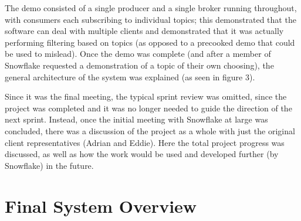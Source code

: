 \documentclass[a4paper, 12pt, twoside]{article}
\begin{document}
The demo consisted of a single producer and a single broker running throughout, with consumers each subscribing to individual topics; this demonstrated that the software can deal with multiple clients and demonstrated that it was actually performing filtering based on topics (as opposed to a precooked demo that could be used to mislead). Once the demo was complete (and after a member of Snowflake requested a demonstration of a topic of their own choosing), the general architecture of the system was explained (as seen in figure 3).

Since it was the final meeting, the typical sprint review was omitted, since the project was completed and it was no longer needed to guide the direction of the next sprint.  Instead, once the initial meeting with Snowflake at large was concluded, there was a discussion of the project as a whole with just the original client representatives (Adrian and Eddie). Here the total project progress was discussed, as well as how the work would be used and developed further (by Snowflake) in the future.



\section{Final System Overview}
\label{sec:final_system}
\end{document}
